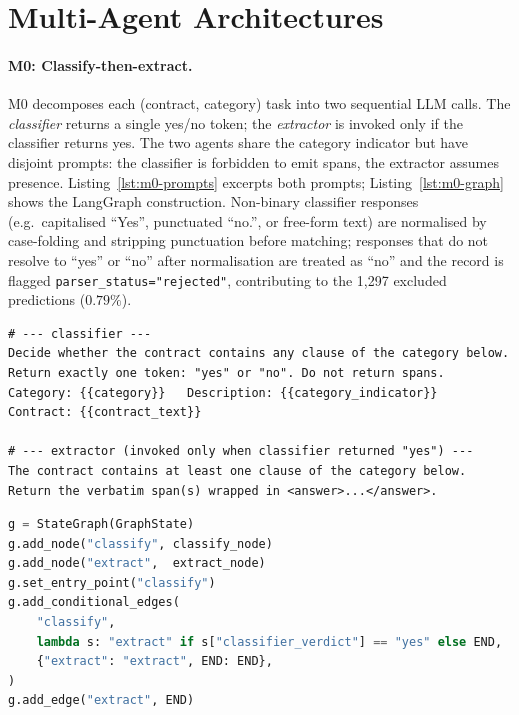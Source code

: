 \section{Multi-Agent Architectures}\label{sec:sys:multiagent}

\paragraph{M0: Classify-then-extract.}
M0 decomposes each (contract, category) task into two sequential LLM calls. The
\emph{classifier} returns a single yes/no token; the \emph{extractor} is invoked
only if the classifier returns yes. The two agents share the category indicator but
have disjoint prompts: the classifier is forbidden to emit spans, the extractor
assumes presence. Listing~\ref{lst:m0-prompts} excerpts both prompts;
Listing~\ref{lst:m0-graph} shows the LangGraph construction. Non-binary classifier
responses (e.g.\ capitalised ``Yes'', punctuated ``no.'', or free-form text) are
normalised by case-folding and stripping punctuation before matching; responses that
do not resolve to ``yes'' or ``no'' after normalisation are treated as ``no'' and the
record is flagged \texttt{parser\_status="rejected"}, contributing to the 1{,}297
excluded predictions ($0.79\%$).

\begin{lstlisting}[caption={M0 classifier and extractor prompts (abridged).},
  label={lst:m0-prompts}, basicstyle=\footnotesize\ttfamily, frame=single]
# --- classifier ---
Decide whether the contract contains any clause of the category below.
Return exactly one token: "yes" or "no". Do not return spans.
Category: {{category}}   Description: {{category_indicator}}
Contract: {{contract_text}}

# --- extractor (invoked only when classifier returned "yes") ---
The contract contains at least one clause of the category below.
Return the verbatim span(s) wrapped in <answer>...</answer>.
\end{lstlisting}

\begin{lstlisting}[language=Python, caption={M0 LangGraph construction.},
  label={lst:m0-graph}, basicstyle=\footnotesize\ttfamily,
  keywordstyle=\bfseries\color{TUMBlue}, frame=single]
g = StateGraph(GraphState)
g.add_node("classify", classify_node)
g.add_node("extract",  extract_node)
g.set_entry_point("classify")
g.add_conditional_edges(
    "classify",
    lambda s: "extract" if s["classifier_verdict"] == "yes" else END,
    {"extract": "extract", END: END},
)
g.add_edge("extract", END)
\end{lstlisting}

